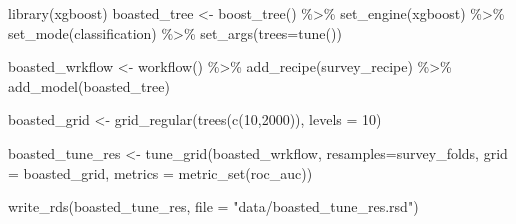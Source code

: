 \documentclass[
]{article}
\newenvironment{Shaded}{\begin{snugshade}}{\end{snugshade}}
\newcommand{\AttributeTok}[1]{\textcolor[rgb]{0.77,0.63,0.00}{#1}}
\newcommand{\DecValTok}[1]{\textcolor[rgb]{0.00,0.00,0.81}{#1}}
\newcommand{\FunctionTok}[1]{\textcolor[rgb]{0.00,0.00,0.00}{#1}}
\newcommand{\NormalTok}[1]{#1}
\newcommand{\OtherTok}[1]{\textcolor[rgb]{0.56,0.35,0.01}{#1}}
\newcommand{\SpecialCharTok}[1]{\textcolor[rgb]{0.00,0.00,0.00}{#1}}
\newcommand{\StringTok}[1]{\textcolor[rgb]{0.31,0.60,0.02}{#1}}
\begin{document}
\begin{Shaded}
\begin{Highlighting}[]
\FunctionTok{library}\NormalTok{(xgboost)}
\NormalTok{boasted\_tree }\OtherTok{\textless{}{-}} \FunctionTok{boost\_tree}\NormalTok{() }\SpecialCharTok{\%\textgreater{}\%}
  \FunctionTok{set\_engine}\NormalTok{(}\StringTok{\textquotesingle{}xgboost\textquotesingle{}}\NormalTok{) }\SpecialCharTok{\%\textgreater{}\%}
  \FunctionTok{set\_mode}\NormalTok{(}\StringTok{\textquotesingle{}classification\textquotesingle{}}\NormalTok{) }\SpecialCharTok{\%\textgreater{}\%}
  \FunctionTok{set\_args}\NormalTok{(}\AttributeTok{trees=}\FunctionTok{tune}\NormalTok{())}

\NormalTok{boasted\_wrkflow }\OtherTok{\textless{}{-}} \FunctionTok{workflow}\NormalTok{() }\SpecialCharTok{\%\textgreater{}\%}
  \FunctionTok{add\_recipe}\NormalTok{(survey\_recipe) }\SpecialCharTok{\%\textgreater{}\%}
  \FunctionTok{add\_model}\NormalTok{(boasted\_tree)}

\NormalTok{boasted\_grid }\OtherTok{\textless{}{-}} \FunctionTok{grid\_regular}\NormalTok{(}\FunctionTok{trees}\NormalTok{(}\FunctionTok{c}\NormalTok{(}\DecValTok{10}\NormalTok{,}\DecValTok{2000}\NormalTok{)), }\AttributeTok{levels =} \DecValTok{10}\NormalTok{)}

\NormalTok{boasted\_tune\_res }\OtherTok{\textless{}{-}} \FunctionTok{tune\_grid}\NormalTok{(boasted\_wrkflow, }\AttributeTok{resamples=}\NormalTok{survey\_folds, }\AttributeTok{grid =}\NormalTok{ boasted\_grid, }\AttributeTok{metrics =} \FunctionTok{metric\_set}\NormalTok{(roc\_auc))}

\FunctionTok{write\_rds}\NormalTok{(boasted\_tune\_res, }\AttributeTok{file =} \StringTok{"data/boasted\_tune\_res.rsd"}\NormalTok{)}
\end{Highlighting}
\end{Shaded}

\begin{Shaded}
\end{Shaded}
\end{document}
